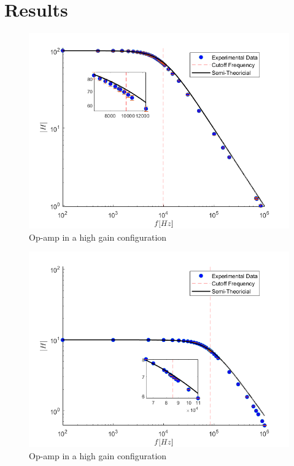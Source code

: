 \documentclass[letterpaper,12pt]{article}
\begin{document}
\section{Results}


\begin{figure}[ht]
    \centering
    \includegraphics[scale = .8]{HighGain.png}
    \caption{Op-amp in a high gain configuration}
    \label{HighG}
\end{figure}


\begin{figure}[ht]
    \centering
    \includegraphics[scale = .8]{LowGain.png}
    \caption{Op-amp in a high gain configuration}
    \label{LowG}
\end{figure}
\end{document}
